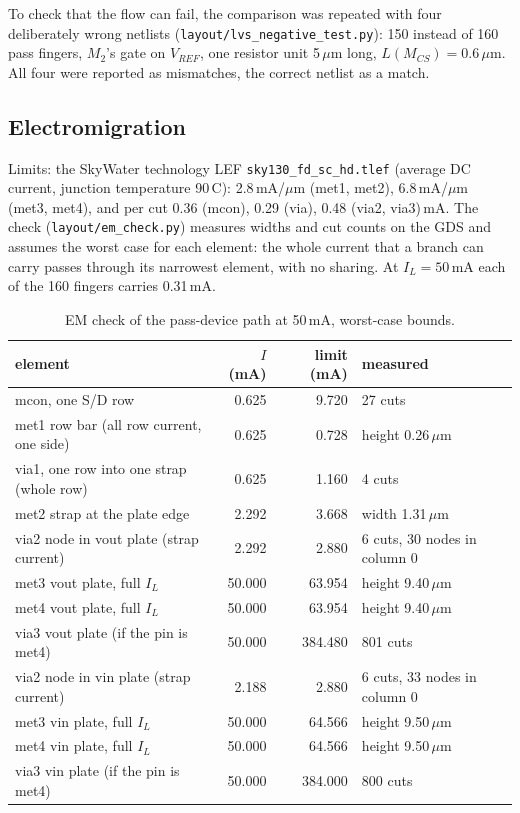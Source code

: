 \documentclass[10pt,a4paper]{article}
\newcommand{\IL}{I_{L}}
\begin{document}
\noindent To check that the flow can fail, the comparison was repeated with four deliberately wrong netlists (\texttt{layout/lvs\_negative\_test.py}): 150 instead of 160 pass fingers, $M_2$'s gate on $V_{REF}$, one resistor unit 5\,$\mu$m long, $L(M_{CS}) = 0.6\,\mu$m. All four were reported as mismatches, the correct netlist as a match.

\subsection{Electromigration}\label{sec:em}
Limits: the SkyWater technology LEF \texttt{sky130\_fd\_sc\_hd.tlef} (average DC current, junction temperature 90\,\textdegree C): 2.8\,mA/$\mu$m (met1, met2), 6.8\,mA/$\mu$m (met3, met4), and per cut 0.36 (mcon), 0.29 (via), 0.48 (via2, via3)\,mA. The check (\texttt{layout/em\_check.py}) measures widths and cut counts on the GDS and assumes the worst case for each element: the whole current that a branch can carry passes through its narrowest element, with no sharing. At $\IL = 50$\,mA each of the 160 fingers carries 0.31\,mA.

\begin{table}[H]
\centering\small
\caption{EM check of the pass-device path at 50\,mA, worst-case bounds.}
\begin{tabular}{lrrl}
\toprule
element & $I$ (mA) & limit (mA) & measured \\
\midrule
mcon, one S/D row & 0.625 & 9.720 & 27 cuts \\
met1 row bar (all row current, one side) & 0.625 & 0.728 & height 0.26\,$\mu$m \\
via1, one row into one strap (whole row) & 0.625 & 1.160 & 4 cuts \\
met2 strap at the plate edge & 2.292 & 3.668 & width 1.31\,$\mu$m \\
via2 node in vout plate (strap current) & 2.292 & 2.880 & 6 cuts, 30 nodes in column 0 \\
met3 vout plate, full $\IL$ & 50.000 & 63.954 & height 9.40\,$\mu$m \\
met4 vout plate, full $\IL$ & 50.000 & 63.954 & height 9.40\,$\mu$m \\
via3 vout plate (if the pin is met4) & 50.000 & 384.480 & 801 cuts \\
via2 node in vin plate (strap current) & 2.188 & 2.880 & 6 cuts, 33 nodes in column 0 \\
met3 vin plate, full $\IL$ & 50.000 & 64.566 & height 9.50\,$\mu$m \\
met4 vin plate, full $\IL$ & 50.000 & 64.566 & height 9.50\,$\mu$m \\
via3 vin plate (if the pin is met4) & 50.000 & 384.000 & 800 cuts \\
\bottomrule
\end{tabular}
\end{table}
\end{document}
